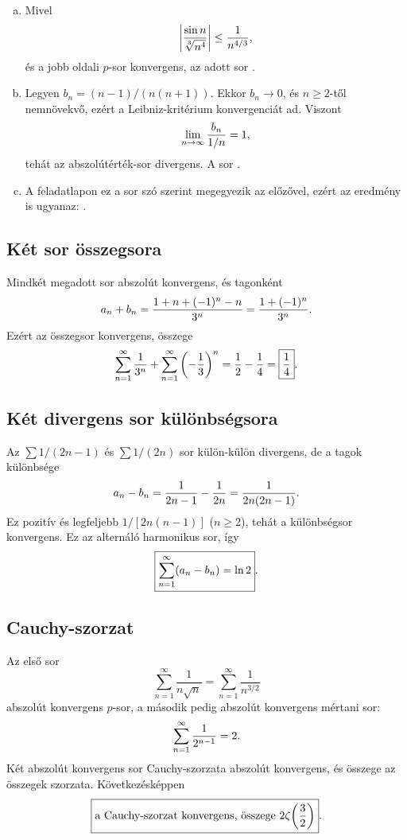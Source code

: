 \documentclass{szb-solution}
\begin{document}
\begin{enumerate}[a)]
  \item Mivel
        $$
          \left|\frac{\sin n}{\sqrt[3]{n^4}}\right|
          \leq\frac1{n^{4/3}}
          \text,
        $$
        és a jobb oldali $p$-sor konvergens, az adott sor
        .

  \item Legyen $b_n=(n-1)/(n(n+1))$. Ekkor $b_n\to0$, és $n\geq2$-től
        nemnövekvő, ezért a Leibniz-kritérium konvergenciát ad. Viszont
        $$
          \lim_{n\to\infty}\frac{b_n}{1/n}=1
          \text,
        $$
        tehát az abszolútérték-sor divergens. A sor
        .

  \item A feladatlapon ez a sor szó szerint megegyezik az előzővel, ezért az
        eredmény is ugyanaz: .
\end{enumerate}

\subsection{Két sor összegsora}

Mindkét megadott sor abszolút konvergens, és tagonként
$$
  a_n+b_n
  =\frac{1+n+(-1)^n-n}{3^n}
  =\frac{1+(-1)^n}{3^n}
  \text.
$$
Ezért az összegsor konvergens, összege
$$
  \sum_{n=1}^{\infty}\frac1{3^n}
  +\sum_{n=1}^{\infty}\left(-\frac13\right)^n
  =\frac12-\frac14
  =\boxed{\frac14}
  \text.
$$

\subsection{Két divergens sor különbségsora}

Az $\sum1/(2n-1)$ és $\sum1/(2n)$ sor külön-külön divergens, de a
tagok különbsége
$$
  a_n-b_n
  =\frac1{2n-1}-\frac1{2n}
  =\frac1{2n(2n-1)}
  \text.
$$
Ez pozitív és legfeljebb $1/[2n(n-1)]$ ($n\geq2$), tehát a különbségsor
konvergens. Ez az alternáló harmonikus sor, így
$$
  \boxed{\sum_{n=1}^{\infty}(a_n-b_n)=\ln2}
  \text.
$$

\subsection{Cauchy-szorzat}

Az első sor
$$
  \sum_{n=1}^{\infty}\frac1{n\sqrt n}
  =\sum_{n=1}^{\infty}\frac1{n^{3/2}}
$$
abszolút konvergens $p$-sor, a második pedig abszolút konvergens mértani sor:
$$
  \sum_{n=1}^{\infty}\frac1{2^{n-1}}=2
  \text.
$$
Két abszolút konvergens sor Cauchy-szorzata abszolút konvergens, és összege
az összegek szorzata. Következésképpen
$$
  \boxed{\text{a Cauchy-szorzat konvergens, összege }
  2\zeta\!\left(\frac32\right)}
  \text.
$$
\end{document}
